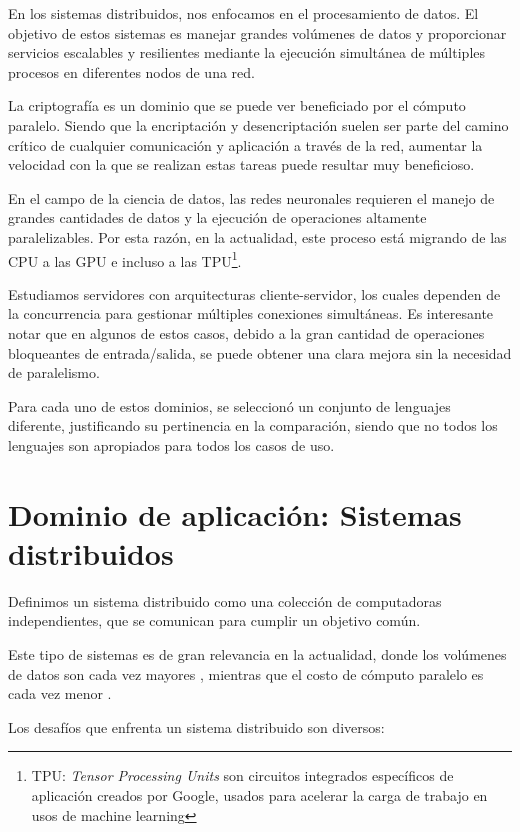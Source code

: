 \documentclass[11pt]{article}
\let\Oldsection\section
\renewcommand{\section}{\FloatBarrier\Oldsection}
\newcommand{\english}[1]{\textit{#1}}
\begin{document}
En los sistemas distribuidos, nos enfocamos en el procesamiento de datos. El objetivo de estos sistemas es manejar grandes volúmenes de datos y proporcionar servicios escalables y resilientes mediante la ejecución simultánea de múltiples procesos en diferentes nodos de una red.

La criptografía es un dominio que se puede ver beneficiado por el cómputo paralelo. Siendo que la encriptación y desencriptación suelen ser parte del camino crítico de cualquier comunicación y aplicación a través de la red, aumentar la velocidad con la que se realizan estas tareas puede resultar muy beneficioso.

En el campo de la ciencia de datos, las redes neuronales requieren el manejo de grandes cantidades de datos y la ejecución de operaciones altamente paralelizables. Por esta razón, en la actualidad, este proceso está migrando de las CPU a las GPU e incluso a las TPU\footnote{TPU: \english{Tensor Processing Units} son circuitos integrados específicos de aplicación creados por Google, usados para acelerar la carga de trabajo en usos de machine learning}.

Estudiamos servidores con arquitecturas cliente-servidor, los cuales dependen de la concurrencia para gestionar múltiples conexiones simultáneas. Es interesante notar que en algunos de estos casos, debido a la gran cantidad de operaciones bloqueantes de entrada/salida, se puede obtener una clara mejora sin la necesidad de paralelismo.

Para cada uno de estos dominios, se seleccionó un conjunto de lenguajes diferente, justificando su pertinencia en la comparación, siendo que no todos los lenguajes son apropiados para todos los casos de uso. 

\newpage

\section{Dominio de aplicación: Sistemas distribuidos}\label{sec:sis_dist}

Definimos un sistema distribuido como una colección de computadoras independientes, que se comunican para cumplir un objetivo común.

Este tipo de sistemas es de gran relevancia en la actualidad, donde los volúmenes de datos son cada vez mayores \cite{sis_dist:data_volume}, mientras que el costo de cómputo paralelo es cada vez menor \cite{sis_dist:compute_price}.

Los desafíos que enfrenta un sistema distribuido son diversos:
\end{document}
